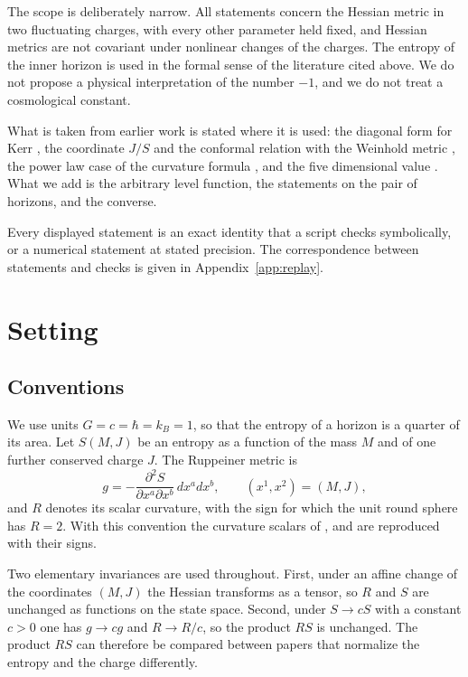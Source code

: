 \documentclass[11pt]{article}
\theoremstyle{definition}
\theoremstyle{remark}
\begin{document}
The scope is deliberately narrow. All statements concern the Hessian metric in two fluctuating charges, with every other parameter held fixed, and Hessian metrics are not covariant under nonlinear changes of the charges. The entropy of the inner horizon is used in the formal sense of the literature cited above. We do not propose a physical interpretation of the number $-1$, and we do not treat a cosmological constant.

What is taken from earlier work is stated where it is used: the diagonal form for Kerr \cite{ABP15}, the coordinate $J/S$ and the conformal relation with the Weinhold metric \cite{AP06}, the power law case of the curvature formula \cite{ABP06}, and the five dimensional value \cite{AP06}. What we add is the arbitrary level function, the statements on the pair of horizons, and the converse.

Every displayed statement is an exact identity that a script checks symbolically, or a numerical statement at stated precision. The correspondence between statements and checks is given in Appendix~\ref{app:replay}.

\section{Setting}\label{sec:setting}

\subsection{Conventions}

We use units $G=c=\hbar=k_{B}=1$, so that the entropy of a horizon is a quarter of its area. Let $S(M,J)$ be an entropy as a function of the mass $M$ and of one further conserved charge $J$. The Ruppeiner metric is
\begin{equation}\label{eq:rup}
g=-\frac{\partial^{2}S}{\partial x^{a}\partial x^{b}}\,dx^{a}dx^{b},
\qquad (x^{1},x^{2})=(M,J),
\end{equation}
and $R$ denotes its scalar curvature, with the sign for which the unit round sphere has $R=2$. With this convention the curvature scalars of \cite{AP06}, \cite{ABP15} and \cite{BMMA} are reproduced with their signs.

Two elementary invariances are used throughout. First, under an affine change of the coordinates $(M,J)$ the Hessian transforms as a tensor, so $R$ and $S$ are unchanged as functions on the state space. Second, under $S\to cS$ with a constant $c>0$ one has $g\to cg$ and $R\to R/c$, so the product $RS$ is unchanged. The product $RS$ can therefore be compared between papers that normalize the entropy and the charge differently.
\end{document}
